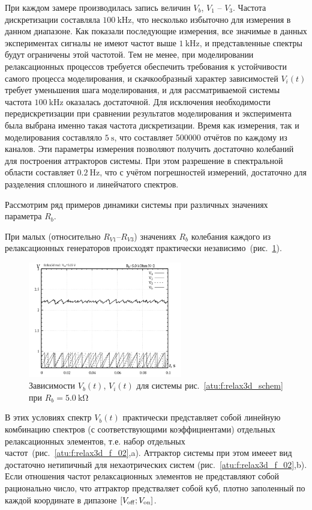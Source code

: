 При каждом замере
производилась запись величин
$V_b$, $V_1$ -- $V_3$.
Частота дискретизации составляла $\SI{100}{\kilo\hertz}$,
что несколько избыточно для измерения в данном диапазоне.
Как показали последующие измерения,
все значимые в данных экспериментах сигналы не имеют
частот выше $\SI{1}{\kilo\hertz}$,
и представленные спектры будут ограничены этой частотой.
Тем не менее, при моделировании релаксационных
процессов требуется обеспечить требования к устойчивости
самого процесса моделирования, и скачкообразный
характер зависимостей $V_i(t)$
требует уменьшения шага моделирования, и для
рассматриваемой системы частота
$\SI{100}{\kilo\hertz}$ оказалась достаточной.
Для исключения необходимости передискретизации
при сравнении результатов моделирования
и эксперимента была выбрана именно такая частота дискретизации.
Время как измерения, так и моделирования составляло
$\SI{5}{\s}$, что составляет 500000 отчётов
по каждому из каналов.
Эти параметры измерения позволяют получить достаточно
колебаний для построения аттракторов системы.
При этом разрешение в спектральной области
составляет
$\SI{0.2}{\hertz}$, что с учётом погрешностей измерений,
достаточно для разделения сплошного и линейчатого спектров.

Рассмотрим ряд примеров динамики системы
при различных значениях параметра $R_b$.

При малых (относительно $R_{V1}$--$R_{V3}$)
значениях $R_b$
колебания каждого из релаксационных генераторов
происходят практически независимо~(рис.~\ref{atu:f:relax3d_t_02}).

\begin{figure}[htb!]
  \centerline{\includegraphics[width=0.6\textwidth]{p/relax3d_t_02.png} }
  \caption{Зависимости $V_b(t)$, $V_i(t)$ для системы рис.~\ref{atu:f:relax3d_schem} при $R_b=\SI{5.0}{\kilo\ohm}$ }
  \label{atu:f:relax3d_t_02}
\end{figure}

В этих условиях спектр $V_b(t)$ практически представляет собой линейную комбинацию спектров
(с соответствующими коэффициентами) отдельных релаксационных
элементов, т.е. набор отдельных частот~(рис.~\ref{atu:f:relax3d_f_02},a).
Аттрактор системы при этом имееет вид достаточно нетипичный для
нехаотрических систем (рис.~\ref{atu:f:relax3d_f_02},b).
Если отношения частот релаксационных элементов
не представляют собой рационально число, что аттрактор
предстваляет собой куб, плотно заполенный по каждой координате в
дипазоне $[ V_\mathrm{off} ; V_\mathrm{on} ] $.


